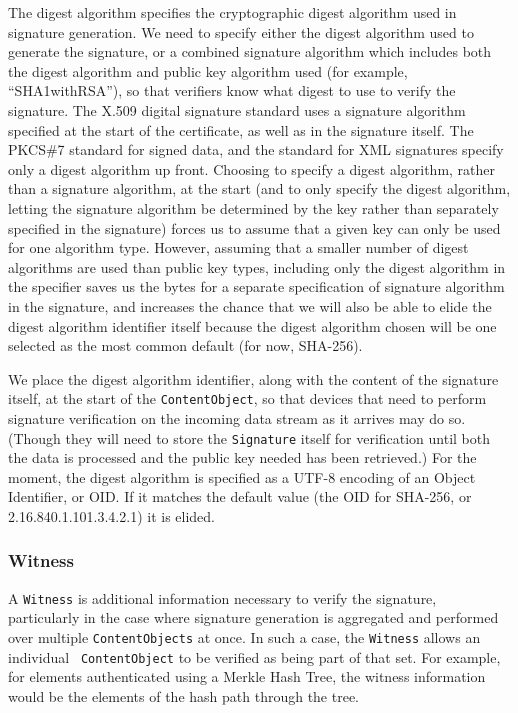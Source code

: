 The digest algorithm specifies the cryptographic digest algorithm used
in signature generation. We need to specify either the digest
algorithm used to generate the signature, or a combined signature
algorithm which includes both the digest algorithm and public key
algorithm used (for example, ``SHA1withRSA''), so that verifiers know
what digest to use to verify the signature. The X.509 digital
signature standard uses a signature algorithm specified at the start
of the certificate, as well as in the signature itself. The PKCS\#7
standard for signed data, and the standard for XML signatures specify
only a digest algorithm up front. Choosing to specify a digest
algorithm, rather than a signature algorithm, at the start (and to
only specify the digest algorithm, letting the signature algorithm be
determined by the key rather than separately specified in the
signature) forces us to assume that a given key can only be used for
one algorithm type. However, assuming that a smaller number of digest
algorithms are used than public key types, including only the digest
algorithm in the specifier saves us the bytes for a separate
specification of signature algorithm in the signature, and increases
the chance that we will also be able to elide the digest algorithm
identifier itself because the digest algorithm chosen will be one
selected as the most common default (for now, SHA-256).

We place the digest algorithm identifier, along with the content of
the signature itself, at the start of the {\tt ContentObject}, so that
devices that need to perform signature verification on the incoming
data stream as it arrives may do so. (Though they will need to store
the {\tt Signature} itself for verification until both the data is
processed and the public key needed has been retrieved.) For the
moment, the digest algorithm is specified as a UTF-8 encoding of an
Object Identifier, or OID. If it matches the default value (the OID
for SHA-256, or 2.16.840.1.101.3.4.2.1) it is elided.


\subsubsection{Witness}

A {\tt Witness} is additional information necessary to verify the
signature, particularly in the case where signature generation is
aggregated and performed over multiple {\tt ContentObjects} at
once. In such a case, the {\tt Witness} allows an individual {\tt
  ContentObject} to be verified as being part of that set. For
example, for elements authenticated using a Merkle Hash Tree, the
witness information would be the elements of the hash path through the
tree.

